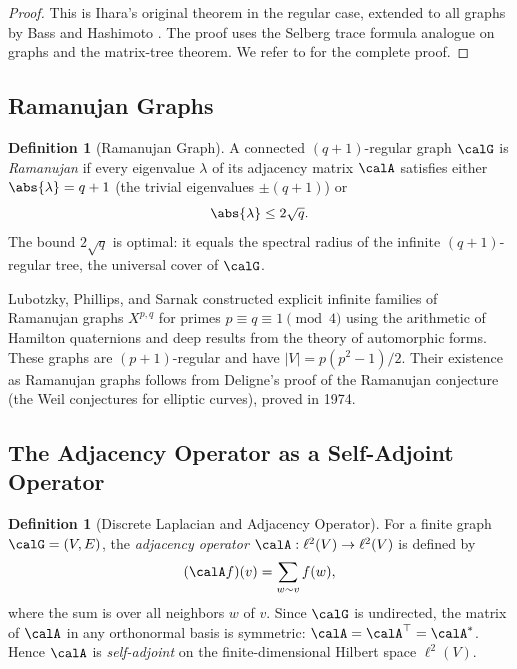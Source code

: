 \documentclass[12pt, a4paper]{article}
\theoremstyle{plain}
\theoremstyle{definition}
\newtheorem{definition}[theorem]{Definition}
\begin{document}
\begin{proof}
  This is Ihara's original theorem \citep{Ihara1966} in the regular case,
  extended to all graphs by Bass and Hashimoto \citep{HaShieh2013}. The
  proof uses the Selberg trace formula analogue on graphs and the matrix-tree
  theorem. We refer to \citet{Terras1999} for the complete proof.
\end{proof}

\subsection{Ramanujan Graphs}

\begin{definition}[Ramanujan Graph]\label{def:ramanujan}
  A connected $(q+1)$-regular graph $\calG$ is \emph{Ramanujan} if every
  eigenvalue $\lambda$ of its adjacency matrix $\calA$ satisfies either
  $\abs{\lambda} = q+1$ (the trivial eigenvalues $\pm(q+1)$) or
  \begin{equation}\label{eq:ramanujan_bound}
    \abs{\lambda} \leq 2\sqrt{q}.
  \end{equation}
  The bound $2\sqrt{q}$ is optimal: it equals the spectral radius of the
  infinite $(q+1)$-regular tree, the universal cover of $\calG$.
\end{definition}

\begin{remark}
  Lubotzky, Phillips, and Sarnak \citep{Selberg1956} constructed explicit
  infinite families of Ramanujan graphs $X^{p,q}$ for primes $p \equiv
  q \equiv 1 \pmod{4}$ using the arithmetic of Hamilton quaternions and deep
  results from the theory of automorphic forms. These graphs are $(p+1)$-regular
  and have $|V| = p(p^2-1)/2$. Their existence as Ramanujan graphs follows from
  Deligne's proof of the Ramanujan conjecture (the Weil conjectures for elliptic
  curves), proved in 1974.
\end{remark}

\subsection{The Adjacency Operator as a Self-Adjoint Operator}

\begin{definition}[Discrete Laplacian and Adjacency Operator]\label{def:adj}
  For a finite graph $\calG = (V, E)$, the \emph{adjacency operator}
  $\calA: \ell^2(V) \to \ell^2(V)$ is defined by
  \begin{equation}
    (\calA f)(v) = \sum_{w \sim v} f(w),
  \end{equation}
  where the sum is over all neighbors $w$ of $v$. Since $\calG$ is undirected,
  the matrix of $\calA$ in any orthonormal basis is symmetric:
  $\calA = \calA^\top = \calA^*$. Hence $\calA$ is \emph{self-adjoint} on the
  finite-dimensional Hilbert space $\ell^2(V)$.
\end{definition}
\end{document}
